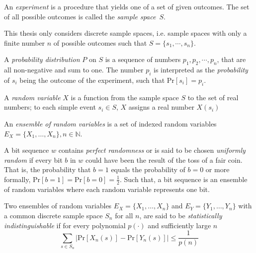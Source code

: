 \begin{defn}[Experiment]
\label{def:experiment}
 An \textit{experiment} is a procedure that yields one of a set of given outcomes. The set of all possible outcomes is called the \textit{sample space}~$S$.~\cite{book:handbook_of_applied_cryptography}
\end{defn}

This thesis only considers discrete sample spaces, i.e. sample spaces with only a finite number $n$ of possible outcomes such that $S = \{ s_1, \cdots, s_n \}$.

\begin{defn}
\label{def:experiment}
 A \textit{probability distribution} $P$ on $S$ is a sequence of numbers $p_1, p_2, \cdots, p_n$, that are all non-negative and sum to one. The number $p_i$ is interpreted as the \textit{probability} of $s_i$ being the outcome of the experiment, such that $\textrm{Pr} \left[ s_i \right] = p_i$.~\cite{book:handbook_of_applied_cryptography}
\end{defn}

\begin{defn}
\label{def:experiment}
 A \textit{random variable} $X$ is a function from the sample space $S$ to the set of real numbers; to each simple event $s_i \in S$, $X$ assigns a real number $X \left( s_i \right)$
\end{defn}

\begin{defn}
\label{def:experiment}
 An \textit{ensemble of random variables} is a set of indexed random variables $E_X = \{ X_1, \ldots , X_n \}, n \in \mathbb{N}$.
\end{defn}

\begin{defn}
\label{def:perfect_randomness}
 A bit sequence $w$ contains \textit{perfect randomness} or is said to be chosen \textit{uniformly random} if every bit $b$ in $w$ could have been the result of the toss of a fair coin. That is, the probability that $b = 1$ equals the probability of $b = 0$ or more formally, $\textrm{Pr} \left[ b = 1 \right] = \textrm{Pr} \left[ b = 0 \right] = \frac{1}{2}$. Such that, a bit sequence is an ensemble of random variables where each random variable represents one bit.
\end{defn}

\begin{defn}
\label{def:statistical_indistinguishability}
 Two ensembles of random variables $E_X = \{ X_1, \ldots , X_n \}$ and $E_Y = \{ Y_1, \ldots , Y_n \}$ with a common discrete sample space $S_n$ for all $n$, are said to be \textit{statistically indistinguishable} if for every polynomial $p \left( \cdot \right)$ and sufficiently large $n$
 \begin{equation*}
  \sum_{s \in S_n} \lvert \textrm{Pr} \left[ X_n \left( s \right) \right] - \textrm{Pr} \left[ Y_n \left( s \right) \right] \rvert \leq \frac{1}{p \left( n \right)}
 \end{equation*}
\end{defn}

